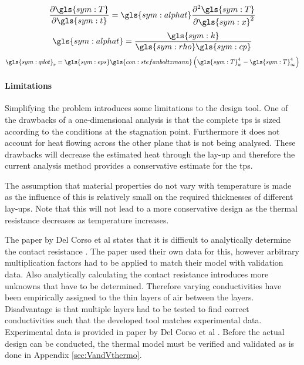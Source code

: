 \begin{multicols}{3}
\begin{equation}
\frac{\partial \gls{sym:T}}{\partial \gls{sym:t}} = \gls{sym:alphat}\frac{\partial^2\gls{sym:T}}{\partial \gls{sym:x}^2}
\label{eq:thermheat}
\end{equation}\break
\begin{equation}
\gls{sym:alphat} = \frac{\gls{sym:k}}{\gls{sym:rho}\gls{sym:cp}}
\label{eq:thermdif}
\end{equation}\break
\begin{equation}
\gls{sym:qdot}_r = \gls{sym:eps}\gls{con:stefanboltzmann}\left(\gls{sym:T}_w^4-\gls{sym:T}_\infty^4\right)
\label{eq:thermrad}
\end{equation}
\end{multicols}


\paragraph{Limitations}
Simplifying the problem introduces some limitations to the design tool. One of the drawbacks of a one-dimensional analysis is that the complete \gls{tps} is sized according to the conditions at the stagnation point. Furthermore it does not account for heat flowing across the other plane that is not being analysed. These drawbacks will decrease the estimated heat through the lay-up and therefore the current analysis method provides a conservative estimate for the \gls{tps}. 

The assumption that material properties do not vary with temperature is made as the influence of this is relatively small on the required thicknesses of different lay-ups. Note that this will not lead to a more conservative design as the thermal resistance decreases as temperature increases. 

The paper by Del Corso et al states that it is difficult to analytically determine the contact resistance \cite{Corso2009}. The paper used their own data for this, however arbitrary multiplication factors had to be applied to match their model with validation data. Also analytically calculating the contact resistance introduces more unknowns that have to be determined. Therefore varying conductivities have been empirically assigned to the thin layers of air between the layers. Disadvantage is that multiple layers had to be tested to find correct conductivities such that the developed tool matches experimental data. Experimental data is provided in paper by Del Corso et al \cite{Corso2009,Corso2011}. Before the actual design can be conducted, the thermal model must be verified and validated as is done in Appendix \ref{sec:VandVthermo}.




